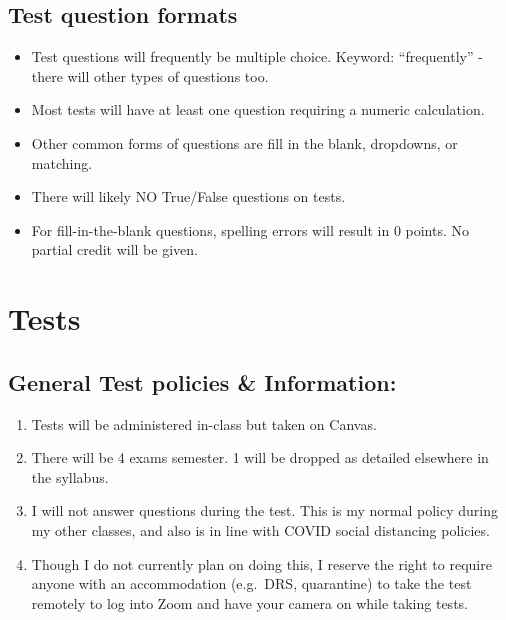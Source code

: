 \documentclass[
]{book}
\providecommand{\tightlist}{%
  \setlength{\itemsep}{0pt}\setlength{\parskip}{0pt}}
\begin{document}
\hypertarget{test-question-formats}{%
\section{Test question formats}\label{test-question-formats}}

\begin{itemize}
\tightlist
\item
  Test questions will frequently be multiple choice. Keyword: ``frequently'' - there will other types of questions too.
\item
  Most tests will have at least one question requiring a numeric calculation.\\
\item
  Other common forms of questions are fill in the blank, dropdowns, or matching.
\item
  There will likely NO True/False questions on tests.
\item
  For fill-in-the-blank questions, spelling errors will result in 0 points. No partial credit will be given.
\end{itemize}

\hypertarget{tests}{%
\chapter{Tests}\label{tests}}

\hypertarget{general-test-policies-information}{%
\section{General Test policies \& Information:}\label{general-test-policies-information}}

\begin{enumerate}
\def\labelenumi{\arabic{enumi}.}
\tightlist
\item
  Tests will be administered in-class but taken on Canvas.
\item
  There will be 4 exams semester. 1 will be dropped as detailed elsewhere in the syllabus.
\item
  I will not answer questions during the test. This is my normal policy during my other classes, and also is in line with COVID social distancing policies.
\item
  Though I do not currently plan on doing this, I reserve the right to require anyone with an accommodation (e.g.~DRS, quarantine) to take the test remotely to log into Zoom and have your camera on while taking tests.
\end{enumerate}
\end{document}
